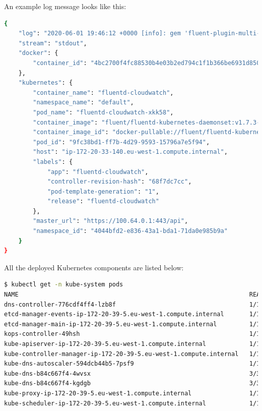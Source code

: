 An example log message looks like this:
\begin{lstlisting}[basicstyle=\tiny,caption={An example Kubernetes log message, presented on AWS CloudWatch},captionpos=b,language=Bash,xleftmargin=1cm]
{
    "log": "2020-06-01 19:46:12 +0000 [info]: gem 'fluent-plugin-multi-format-parser' version '1.0.0'\n",
    "stream": "stdout",
    "docker": {
        "container_id": "4bc2700f4fc88530b4e03b2ed794c1f1b366be6931d8500a8ccf21503d2c5b97"
    },
    "kubernetes": {
        "container_name": "fluentd-cloudwatch",
        "namespace_name": "default",
        "pod_name": "fluentd-cloudwatch-xkk58",
        "container_image": "fluent/fluentd-kubernetes-daemonset:v1.7.3-debian-cloudwatch-1.0",
        "container_image_id": "docker-pullable://fluent/fluentd-kubernetes-daemonset@sha256:9b8b2f99ea884853205150364eceaac9fff5ea97fc3300cc0080f48c3eac8b8a",
        "pod_id": "9fc38bd1-ff7b-4d29-9593-15796a7e5f94",
        "host": "ip-172-20-33-140.eu-west-1.compute.internal",
        "labels": {
            "app": "fluentd-cloudwatch",
            "controller-revision-hash": "68f7dc7cc",
            "pod-template-generation": "1",
            "release": "fluentd-cloudwatch"
        },
        "master_url": "https://100.64.0.1:443/api",
        "namespace_id": "4044bfd2-e836-43a1-bda1-71da0e985b9a"
    }
}
\end{lstlisting}

All the deployed Kubernetes components are listed below:
\begin{lstlisting}[basicstyle=\tiny,caption={TODO},captionpos=b,language=Bash,xleftmargin=1cm]
$ kubectl get -n kube-system pods
NAME                                                                READY   STATUS    RESTARTS   AGE
dns-controller-776cdf4ff4-lzb8f                                     1/1     Running   0          2m28s
etcd-manager-events-ip-172-20-39-5.eu-west-1.compute.internal       1/1     Running   0          2m20s
etcd-manager-main-ip-172-20-39-5.eu-west-1.compute.internal         1/1     Running   0          2m24s
kops-controller-49hsh                                               1/1     Running   0          89s
kube-apiserver-ip-172-20-39-5.eu-west-1.compute.internal            1/1     Running   3          82s
kube-controller-manager-ip-172-20-39-5.eu-west-1.compute.internal   1/1     Running   0          100s
kube-dns-autoscaler-594dcb44b5-7psf9                                1/1     Running   0          2m31s
kube-dns-b84c667f4-4wvsx                                            3/3     Running   0          2m32s
kube-dns-b84c667f4-kgdgb                                            3/3     Running   0          61s
kube-proxy-ip-172-20-39-5.eu-west-1.compute.internal                1/1     Running   0          2m20s
kube-scheduler-ip-172-20-39-5.eu-west-1.compute.internal            1/1     Running   0          93s
\end{lstlisting}

